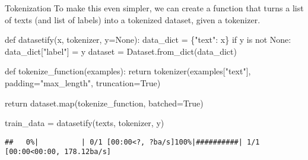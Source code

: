 \documentclass[
  10pt,
  ignorenonframetext,
  aspectratio=169]{beamer}
\newenvironment{Shaded}{\begin{snugshade}}{\end{snugshade}}
\newcommand{\BuiltInTok}[1]{\textcolor[rgb]{0.80,0.80,0.80}{#1}}
\newcommand{\ControlFlowTok}[1]{\textcolor[rgb]{0.94,0.87,0.69}{#1}}
\newcommand{\KeywordTok}[1]{\textcolor[rgb]{0.94,0.87,0.69}{#1}}
\newcommand{\NormalTok}[1]{\textcolor[rgb]{0.80,0.80,0.80}{#1}}
\newcommand{\OperatorTok}[1]{\textcolor[rgb]{0.94,0.94,0.82}{#1}}
\newcommand{\StringTok}[1]{\textcolor[rgb]{0.80,0.58,0.58}{#1}}
\newcommand{\VariableTok}[1]{\textcolor[rgb]{0.80,0.80,0.80}{#1}}
\begin{document}
\begin{frame}[fragile]{Tokenization}
\protect\hypertarget{tokenization-1}{}
To make this even simpler, we can create a function that turns a list of
texts (and list of labels) into a tokenized dataset, given a tokenizer.

\medskip
\scriptsize

\begin{Shaded}
\begin{Highlighting}[]
\KeywordTok{def}\NormalTok{ datasetify(x, tokenizer, y}\OperatorTok{=}\VariableTok{None}\NormalTok{):}
\NormalTok{    data\_dict }\OperatorTok{=}\NormalTok{ \{}\StringTok{"text"}\NormalTok{: x\}}
    \ControlFlowTok{if}\NormalTok{ y }\KeywordTok{is} \KeywordTok{not} \VariableTok{None}\NormalTok{:}
\NormalTok{        data\_dict[}\StringTok{"label"}\NormalTok{] }\OperatorTok{=}\NormalTok{ y}
\NormalTok{    dataset }\OperatorTok{=}\NormalTok{ Dataset.from\_dict(data\_dict)}

    \KeywordTok{def}\NormalTok{ tokenize\_function(examples):}
        \ControlFlowTok{return}\NormalTok{ tokenizer(examples[}\StringTok{"text"}\NormalTok{], padding}\OperatorTok{=}\StringTok{"max\_length"}\NormalTok{, truncation}\OperatorTok{=}\VariableTok{True}\NormalTok{)}

    \ControlFlowTok{return}\NormalTok{ dataset.}\BuiltInTok{map}\NormalTok{(tokenize\_function, batched}\OperatorTok{=}\VariableTok{True}\NormalTok{)}
  
\NormalTok{train\_data }\OperatorTok{=}\NormalTok{ datasetify(texts, tokenizer, y)}
\end{Highlighting}
\end{Shaded}

\begin{verbatim}
##   0%|          | 0/1 [00:00<?, ?ba/s]100%|##########| 1/1 [00:00<00:00, 178.12ba/s]
\end{verbatim}
\end{frame}
\end{document}
